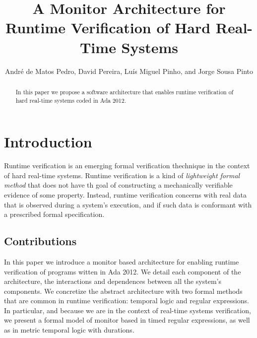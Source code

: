 \documentclass[]{llncs}
\begin{document}
\title{A Monitor Architecture for Runtime Verification of Hard Real-Time Systems}

\author{André de Matos Pedro, David Pereira, Luís Miguel Pinho, and Jorge Sousa Pinto}

\maketitle

\begin{abstract}
In this paper we propose a software architecture that enables runtime verification of hard real-time systems coded in Ada 2012. 
\end{abstract}


\section{Introduction}

Runtime verification is an emerging formal verification thechnique in the context of hard real-time systems. Runtime verification is a kind of {\em lightweight formal method} that does not have th goal of constructing a mechanically verifiable evidence of some property. Instead, runtime verification concerns with real data that is observed during a system's execution, and if such data is conformant with a prescribed formal specification.



\subsection{Contributions}

In this paper we introduce a monitor based architecture for enabling runtime verification of programs witten in Ada 2012. We detail each component of the architecture, the interactions and dependences between all the system's components. We concretize the abstract architecture with two formal methods that are common in runtime verification: temporal logic and regular expressions. In particular, and because we are in the context of real-time systems verification, we present a formal model of monitor based in timed regular expressions, as well as in metric temporal logic with durations. 
\end{document}
